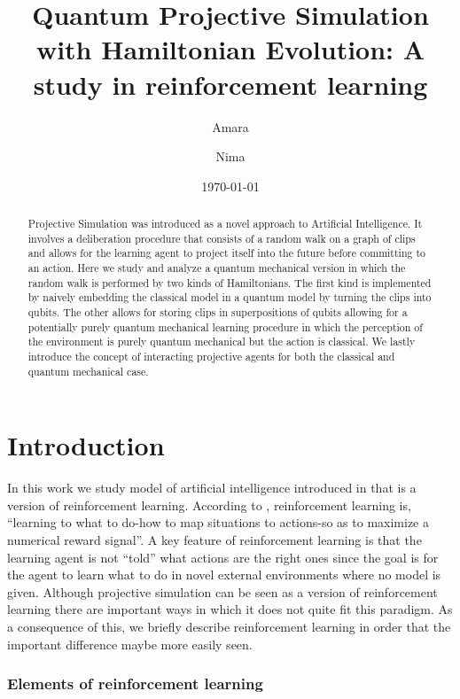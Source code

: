 \documentclass[twocolumn,prX,longbibliography]{revtex4}
\begin{document}
\title{Quantum Projective Simulation with Hamiltonian Evolution: A study in reinforcement learning}
\author{Amara }
\author{ Nima }
\date{\today}

\begin{abstract}
Projective Simulation was introduced as a novel approach to Artificial Intelligence. It involves a deliberation procedure that consists of  a random walk on a graph of clips and allows for the learning agent to project itself into the future before committing to an action. Here we study and analyze a quantum mechanical version in which the random walk is performed by two kinds of Hamiltonians. The first kind is implemented by naively embedding the classical model in a quantum model by turning the clips into qubits. The other allows for storing clips in superpositions of qubits allowing for a potentially purely quantum mechanical learning procedure in which the perception of the environment is purely quantum mechanical but the action is classical. We lastly introduce the concept of interacting projective agents for both the classical and quantum mechanical case.
\end{abstract}
\maketitle

\section{Introduction}

In this work we study model of artificial intelligence introduced in \cite{J.Briegel2012} that is a version of reinforcement learning. According to \cite{Sutton1998}, reinforcement learning is, ``learning to   what  to  do-how  to  map  situations  to actions-so  as  to  maximize  a  numerical  reward  signal''. A key feature of reinforcement learning is that the learning agent is not ``told'' what actions are the right ones since the goal is for the agent to learn what to do in novel external environments where no model is given. Although projective simulation can be seen as a version of reinforcement learning there are important ways in which it does not quite fit this paradigm. As a consequence of this, we briefly describe reinforcement learning in order that the important difference maybe more easily seen. 

\subsubsection*{Elements of reinforcement learning}
\end{document}
